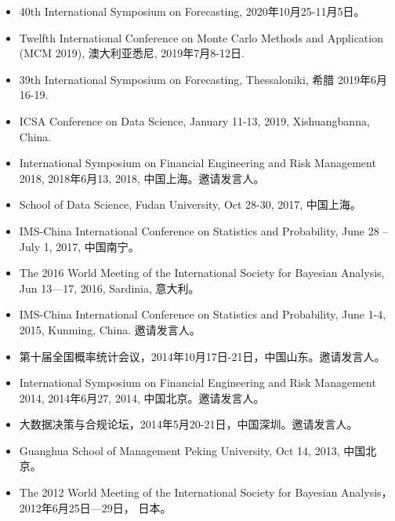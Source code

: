 \documentclass[twoside,a4paper,10pt]{amsart}
\begin{document}
\begin{itemize}

\item 40th International Symposium on Forecasting,  2020年10月25-11月5日。

\item Twelfth International Conference on Monte Carlo Methods and Application (MCM 2019),
  澳大利亚悉尼, 2019年7月8-12日.

\item 39th International Symposium on Forecasting, Thessaloniki, 希腊 2019年6月16-19.

\item ICSA Conference on Data Science, January 11-13, 2019, Xishuangbanna, China.

\item International Symposium on Financial Engineering and Risk Management 2018, 2018年6月13,
  2018, 中国上海。邀请发言人。

\item School of Data Science, Fudan University, Oct 28-30, 2017, 中国上海。

\item IMS-China International Conference on Statistics and Probability, June 28 – July 1,
  2017, 中国南宁。


\item The 2016 World Meeting of the International Society for Bayesian Analysis, Jun
  13—17, 2016, Sardinia, 意大利。

\item IMS-China International Conference on Statistics and Probability, June 1-4, 2015,
  Kunming, China. 邀请发言人。

\item 第十届全国概率统计会议，2014年10月17日-21日，中国山东。邀请发言人。

\item International Symposium on Financial Engineering and Risk Management 2014, 2014年6月27,
  2014, 中国北京。邀请发言人。

\item 大数据决策与合规论坛，2014年5月20-21日，中国深圳。邀请发言人。

\item Guanghua School of Management Peking University, Oct 14, 2013, 中国北京。

\item The 2012 World Meeting of the International Society for Bayesian
  Analysis， 2012年6月25日---29日， 日本。


\end{itemize}
\end{document}
